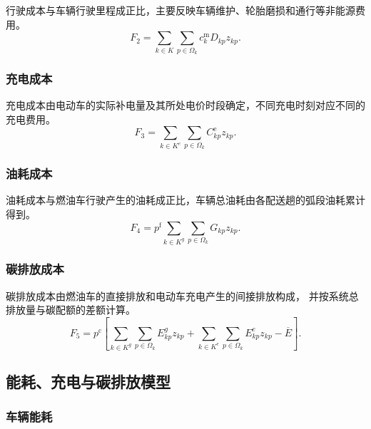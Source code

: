 行驶成本与车辆行驶里程成正比，主要反映车辆维护、轮胎磨损和通行等非能源费用。
\begin{equation}
F_2=\sum_{k\in K}\sum_{p\in\Omega_k}c_k^{\mathrm m}D_{kp}z_{kp}.
\label{eq:unified-f2}
\end{equation}

\subsubsection{充电成本}

充电成本由电动车的实际补电量及其所处电价时段确定，不同充电时刻对应不同的充电费用。
\begin{equation}
F_3=\sum_{k\in K^{e}}\sum_{p\in\Omega_k}C_{kp}^{\mathrm e}z_{kp}.
\label{eq:unified-f3}
\end{equation}

\subsubsection{油耗成本}

油耗成本与燃油车行驶产生的油耗成正比，车辆总油耗由各配送趟的弧段油耗累计得到。
\begin{equation}
F_4=p^{\mathrm f}\sum_{k\in K^{g}}\sum_{p\in\Omega_k}G_{kp}z_{kp}.
\label{eq:unified-f4}
\end{equation}

\subsubsection{碳排放成本}

碳排放成本由燃油车的直接排放和电动车充电产生的间接排放构成，
并按系统总排放量与碳配额的差额计算。
\begin{equation}
F_5=p^{\mathrm c}\left[
\sum_{k\in K^{g}}\sum_{p\in\Omega_k}E_{kp}^{g}z_{kp}
+\sum_{k\in K^{e}}\sum_{p\in\Omega_k}E_{kp}^{e}z_{kp}
-\overline E
\right].
\label{eq:unified-f5}
\end{equation}

\subsection{能耗、充电与碳排放模型}

\subsubsection{车辆能耗}

